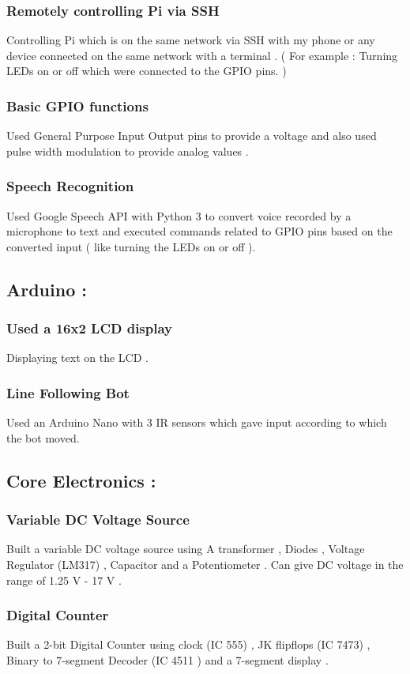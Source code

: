 \documentclass{article}
\begin{document}
    \subsubsection{Remotely controlling Pi via SSH}
    Controlling Pi which is on the same network via SSH with my phone or any device connected on the same network with a terminal .
    ( For example : Turning LEDs on or off which were connected to the GPIO pins. ) 
    \subsubsection{Basic GPIO functions}
    Used General Purpose Input Output pins to provide a voltage and also used pulse width modulation to provide analog values .
    \subsubsection{Speech Recognition}
    Used Google Speech API with Python 3 to convert voice recorded by a microphone
    to text and executed commands related to GPIO pins based on the converted input ( like turning the LEDs on or off ).
    \subsection{Arduino :}
    \subsubsection{Used a 16x2 LCD display}
    Displaying text on the LCD .
    \subsubsection{Line Following Bot}
    Used an Arduino Nano with 3 IR sensors which gave input according to which the bot moved. 
    \subsection{Core Electronics :}
    \subsubsection{Variable DC Voltage Source}
    Built a variable DC voltage source using A transformer , Diodes , Voltage Regulator (LM317) , Capacitor and a Potentiometer . Can give DC voltage in the range of 1.25 V - 17 V .
    \subsubsection{Digital Counter}
    Built a 2-bit Digital Counter using clock (IC 555) , JK flipflops (IC 7473) , Binary to 7-segment Decoder (IC 4511 ) and a 7-segment display .
    
    
    
     
\end{document}

